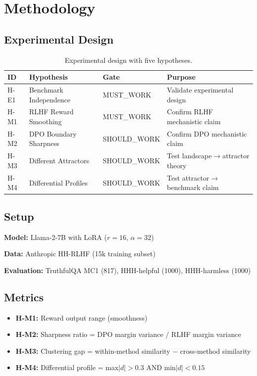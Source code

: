 \section{Methodology}

\subsection{Experimental Design}

\begin{table}[h]
\centering
\begin{tabular}{llll}
\toprule
ID & Hypothesis & Gate & Purpose \\
\midrule
H-E1 & Benchmark Independence & MUST\_WORK & Validate experimental design \\
H-M1 & RLHF Reward Smoothing & MUST\_WORK & Confirm RLHF mechanistic claim \\
H-M2 & DPO Boundary Sharpness & SHOULD\_WORK & Confirm DPO mechanistic claim \\
H-M3 & Different Attractors & SHOULD\_WORK & Test landscape$\rightarrow$attractor theory \\
H-M4 & Differential Profiles & SHOULD\_WORK & Test attractor$\rightarrow$benchmark claim \\
\bottomrule
\end{tabular}
\caption{Experimental design with five hypotheses.}
\label{tab:hypotheses}
\end{table}

\subsection{Setup}

\textbf{Model:} Llama-2-7B \citep{touvron2023llama} with LoRA \citep{hu2022lora} ($r=16$, $\alpha=32$)

\textbf{Data:} Anthropic HH-RLHF (15k training subset)

\textbf{Evaluation:} TruthfulQA MC1 (817), HHH-helpful (1000), HHH-harmless (1000)

\subsection{Metrics}

\begin{itemize}
    \item \textbf{H-M1:} Reward output range (smoothness)
    \item \textbf{H-M2:} Sharpness ratio = DPO margin variance / RLHF margin variance
    \item \textbf{H-M3:} Clustering gap = within-method similarity $-$ cross-method similarity
    \item \textbf{H-M4:} Differential profile = max$|d| > 0.3$ AND min$|d| < 0.15$
\end{itemize}
